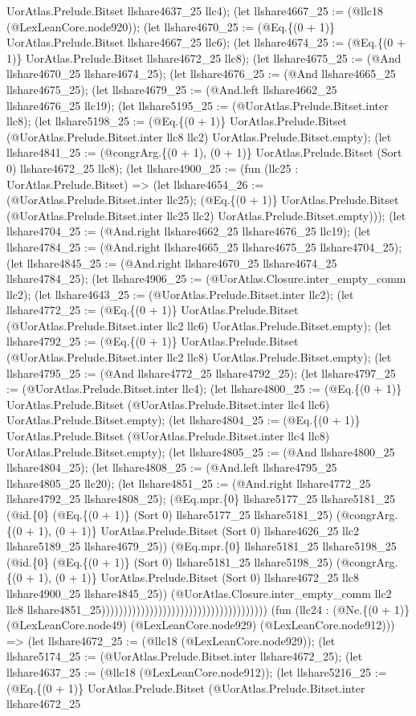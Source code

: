 \documentclass[11pt]{article}
\begin{document}
UorAtlas.Prelude.Bitset llshare4637\_25 llc4); (let llshare4667\_25 := (@llc18 (@LexLeanCore.node920)); (let llshare4670\_25 := (@Eq.\{(0 + 1)\} UorAtlas.Prelude.Bitset llshare4667\_25 llc6); (let llshare4674\_25 := (@Eq.\{(0 + 1)\} UorAtlas.Prelude.Bitset llshare4672\_25 llc8); (let llshare4675\_25 := (@And llshare4670\_25 llshare4674\_25); (let llshare4676\_25 := (@And llshare4665\_25 llshare4675\_25); (let llshare4679\_25 := (@And.left llshare4662\_25 llshare4676\_25 llc19); (let llshare5195\_25 := (@UorAtlas.Prelude.Bitset.inter llc8); (let llshare5198\_25 := (@Eq.\{(0 + 1)\} UorAtlas.Prelude.Bitset (@UorAtlas.Prelude.Bitset.inter llc8 llc2) UorAtlas.Prelude.Bitset.empty); (let llshare4841\_25 := (@congrArg.\{(0 + 1), (0 + 1)\} UorAtlas.Prelude.Bitset (Sort 0) llshare4672\_25 llc8); (let llshare4900\_25 := (fun (llc25 : UorAtlas.Prelude.Bitset) => (let llshare4654\_26 := (@UorAtlas.Prelude.Bitset.inter llc25); (@Eq.\{(0 + 1)\} UorAtlas.Prelude.Bitset (@UorAtlas.Prelude.Bitset.inter llc25 llc2) UorAtlas.Prelude.Bitset.empty))); (let llshare4704\_25 := (@And.right llshare4662\_25 llshare4676\_25 llc19); (let llshare4784\_25 := (@And.right llshare4665\_25 llshare4675\_25 llshare4704\_25); (let llshare4845\_25 := (@And.right llshare4670\_25 llshare4674\_25 llshare4784\_25); (let llshare4906\_25 := (@UorAtlas.Closure.inter\_empty\_comm llc2); (let llshare4643\_25 := (@UorAtlas.Prelude.Bitset.inter llc2); (let llshare4772\_25 := (@Eq.\{(0 + 1)\} UorAtlas.Prelude.Bitset (@UorAtlas.Prelude.Bitset.inter llc2 llc6) UorAtlas.Prelude.Bitset.empty); (let llshare4792\_25 := (@Eq.\{(0 + 1)\} UorAtlas.Prelude.Bitset (@UorAtlas.Prelude.Bitset.inter llc2 llc8) UorAtlas.Prelude.Bitset.empty); (let llshare4795\_25 := (@And llshare4772\_25 llshare4792\_25); (let llshare4797\_25 := (@UorAtlas.Prelude.Bitset.inter llc4); (let llshare4800\_25 := (@Eq.\{(0 + 1)\} UorAtlas.Prelude.Bitset (@UorAtlas.Prelude.Bitset.inter llc4 llc6) UorAtlas.Prelude.Bitset.empty); (let llshare4804\_25 := (@Eq.\{(0 + 1)\} UorAtlas.Prelude.Bitset (@UorAtlas.Prelude.Bitset.inter llc4 llc8) UorAtlas.Prelude.Bitset.empty); (let llshare4805\_25 := (@And llshare4800\_25 llshare4804\_25); (let llshare4808\_25 := (@And.left llshare4795\_25 llshare4805\_25 llc20); (let llshare4851\_25 := (@And.right llshare4772\_25 llshare4792\_25 llshare4808\_25); (@Eq.mpr.\{0\} llshare5177\_25 llshare5181\_25 (@id.\{0\} (@Eq.\{(0 + 1)\} (Sort 0) llshare5177\_25 llshare5181\_25) (@congrArg.\{(0 + 1), (0 + 1)\} UorAtlas.Prelude.Bitset (Sort 0) llshare4626\_25 llc2 llshare5189\_25 llshare4679\_25)) (@Eq.mpr.\{0\} llshare5181\_25 llshare5198\_25 (@id.\{0\} (@Eq.\{(0 + 1)\} (Sort 0) llshare5181\_25 llshare5198\_25) (@congrArg.\{(0 + 1), (0 + 1)\} UorAtlas.Prelude.Bitset (Sort 0) llshare4672\_25 llc8 llshare4900\_25 llshare4845\_25)) (@UorAtlas.Closure.inter\_empty\_comm llc2 llc8 llshare4851\_25)))))))))))))))))))))))))))))))))))))) (fun (llc24 : (@Ne.\{(0 + 1)\} (@LexLeanCore.node49) (@LexLeanCore.node929) (@LexLeanCore.node912))) => (let llshare4672\_25 := (@llc18 (@LexLeanCore.node929)); (let llshare5174\_25 := (@UorAtlas.Prelude.Bitset.inter llshare4672\_25); (let llshare4637\_25 := (@llc18 (@LexLeanCore.node912)); (let llshare5216\_25 := (@Eq.\{(0 + 1)\} UorAtlas.Prelude.Bitset (@UorAtlas.Prelude.Bitset.inter llshare4672\_25 
\end{document}
